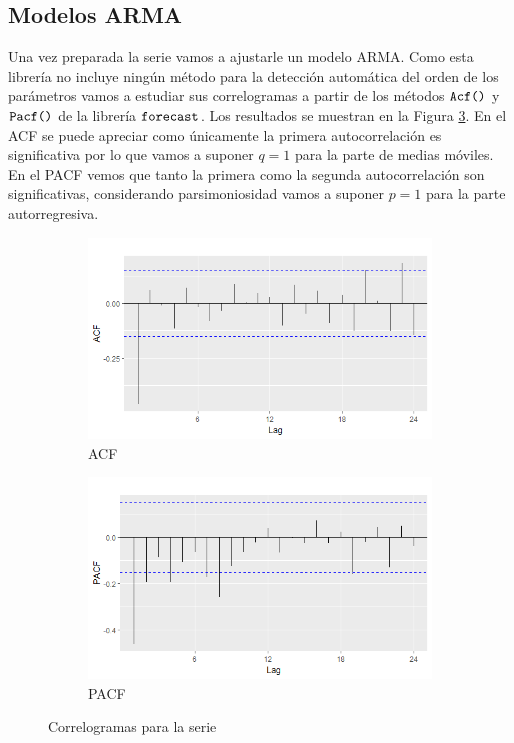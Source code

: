 \subsection{Modelos ARMA}
Una vez preparada la serie vamos a ajustarle un modelo ARMA. Como esta librería no incluye ningún método para la detección automática del orden de los parámetros vamos a estudiar sus correlogramas a partir de los métodos $\verb!Acf()!$ y $\verb!Pacf()!$ de la librería $\verb!forecast!$. Los resultados se muestran en la Figura \ref{a_p}. En el ACF se puede apreciar como únicamente la primera autocorrelación es significativa por lo que vamos a suponer $q = 1$ para la parte de medias móviles. En el PACF vemos que tanto la primera como la segunda autocorrelación son significativas, considerando parsimoniosidad vamos a suponer $p = 1$ para la parte autorregresiva.
\begin{figure} [t]
\begin{subfigure}{.5\textwidth}
  \centering
  \includegraphics[width=.8\linewidth]{Images/Modelizacion/3261.png}
  \caption{ACF}
  \label{fig:sfig1}
\end{subfigure}
\begin{subfigure}{.5\textwidth}
  \centering
  \includegraphics[width=.8\linewidth]{Images/Modelizacion/3262.png}
  \caption{PACF}
  \label{fig:sfig2}
\end{subfigure}
\caption{Correlogramas para la serie }
\label{a_p}
\end{figure}

